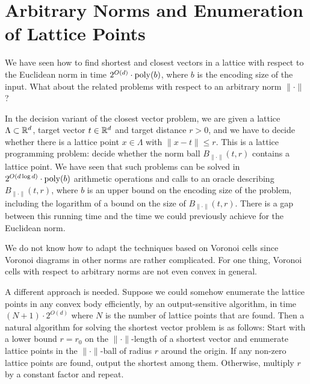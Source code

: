 %
%
%

\chapter{Arbitrary Norms and Enumeration of Lattice Points}

We have seen how to find shortest and closest vectors in a lattice
with respect to the Euclidean norm in time $2^{O(d)} \cdot \operatorname{poly}(b)$,
where $b$ is the encoding size of the input.
What about the related problems with respect to an arbitrary norm $\|\cdot\|$?

In the decision variant of the closest vector problem,
we are given a lattice $\Lambda \subset \mathbb{R}^d$,
target vector $t \in \mathbb{R}^d$
and target distance $r > 0$,
and we have to decide whether there is a lattice point $x \in \Lambda$
with $\|x - t\| \leq r$.
This is a lattice programming problem:
decide whether the norm ball $B_{\|\cdot\|}(t,r)$ contains a lattice point.
We have seen that such problems can be solved in
$2^{O(d \log d)} \cdot \operatorname{poly}(b)$ arithmetic operations
and calls to an oracle describing $B_{\|\cdot\|}(t,r)$,
where $b$ is an upper bound on the encoding size of the problem,
including the logarithm of a bound on the size of $B_{\|\cdot\|}(t,r)$.
There is a gap between this running time and
the time we could previously achieve for the Euclidean norm.

We do not know how to adapt the techniques based on Voronoi cells
since Voronoi diagrams in other norms are rather complicated.
For one thing, Voronoi cells with respect to arbitrary norms are not even convex in general.

A different approach is needed.
Suppose we could somehow enumerate the lattice points in any convex body efficiently,
by an output-sensitive algorithm,
in time $(N+1)\cdot 2^{O(d)}$
where $N$ is the number of lattice points that are found.
Then a natural algorithm for solving the shortest vector problem is as follows:
Start with a lower bound $r = r_0$ on the $\|\cdot\|$-length of a shortest vector
and enumerate lattice points in the $\|\cdot\|$-ball of radius $r$ around the origin.
If any non-zero lattice points are found, output the shortest among them.
Otherwise, multiply $r$ by a constant factor and repeat.

